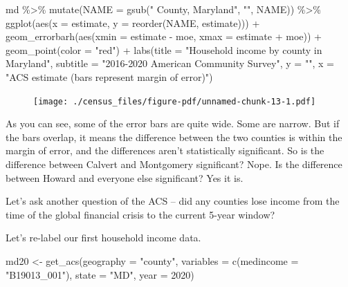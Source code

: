 \documentclass[
  letterpaper,
  DIV=11,
  numbers=noendperiod]{scrreprt}
\newenvironment{Shaded}{\begin{snugshade}}{\end{snugshade}}
\newcommand{\AttributeTok}[1]{\textcolor[rgb]{0.40,0.45,0.13}{#1}}
\newcommand{\DecValTok}[1]{\textcolor[rgb]{0.68,0.00,0.00}{#1}}
\newcommand{\FunctionTok}[1]{\textcolor[rgb]{0.28,0.35,0.67}{#1}}
\newcommand{\NormalTok}[1]{\textcolor[rgb]{0.00,0.23,0.31}{#1}}
\newcommand{\OtherTok}[1]{\textcolor[rgb]{0.00,0.23,0.31}{#1}}
\newcommand{\SpecialCharTok}[1]{\textcolor[rgb]{0.37,0.37,0.37}{#1}}
\newcommand{\StringTok}[1]{\textcolor[rgb]{0.13,0.47,0.30}{#1}}
\begin{document}
\begin{Shaded}
\begin{Highlighting}[]
\NormalTok{md }\SpecialCharTok{\%\textgreater{}\%}
  \FunctionTok{mutate}\NormalTok{(}\AttributeTok{NAME =} \FunctionTok{gsub}\NormalTok{(}\StringTok{" County, Maryland"}\NormalTok{, }\StringTok{""}\NormalTok{, NAME)) }\SpecialCharTok{\%\textgreater{}\%}
  \FunctionTok{ggplot}\NormalTok{(}\FunctionTok{aes}\NormalTok{(}\AttributeTok{x =}\NormalTok{ estimate, }\AttributeTok{y =} \FunctionTok{reorder}\NormalTok{(NAME, estimate))) }\SpecialCharTok{+}
  \FunctionTok{geom\_errorbarh}\NormalTok{(}\FunctionTok{aes}\NormalTok{(}\AttributeTok{xmin =}\NormalTok{ estimate }\SpecialCharTok{{-}}\NormalTok{ moe, }\AttributeTok{xmax =}\NormalTok{ estimate }\SpecialCharTok{+}\NormalTok{ moe)) }\SpecialCharTok{+}
  \FunctionTok{geom\_point}\NormalTok{(}\AttributeTok{color =} \StringTok{"red"}\NormalTok{) }\SpecialCharTok{+}
  \FunctionTok{labs}\NormalTok{(}\AttributeTok{title =} \StringTok{"Household income by county in Maryland"}\NormalTok{,}
       \AttributeTok{subtitle =} \StringTok{"2016{-}2020 American Community Survey"}\NormalTok{,}
       \AttributeTok{y =} \StringTok{""}\NormalTok{,}
       \AttributeTok{x =} \StringTok{"ACS estimate (bars represent margin of error)"}\NormalTok{)}
\end{Highlighting}
\end{Shaded}

\begin{figure}[H]

{\centering \texttt{[image: ./census\_files/figure-pdf/unnamed-chunk-13-1.pdf]}

}

\end{figure}

As you can see, some of the error bars are quite wide. Some are narrow.
But if the bars overlap, it means the difference between the two
counties is within the margin of error, and the differences aren't
statistically significant. So is the difference between Calvert and
Montgomery significant? Nope. Is the difference between Howard and
everyone else significant? Yes it is.

Let's ask another question of the ACS -- did any counties lose income
from the time of the global financial crisis to the current 5-year
window?

Let's re-label our first household income data.

\begin{Shaded}
\begin{Highlighting}[]
\NormalTok{md20 }\OtherTok{\textless{}{-}} \FunctionTok{get\_acs}\NormalTok{(}\AttributeTok{geography =} \StringTok{"county"}\NormalTok{,}
              \AttributeTok{variables =} \FunctionTok{c}\NormalTok{(}\AttributeTok{medincome =} \StringTok{"B19013\_001"}\NormalTok{),}
              \AttributeTok{state =} \StringTok{"MD"}\NormalTok{,}
              \AttributeTok{year =} \DecValTok{2020}\NormalTok{)}
\end{Highlighting}
\end{Shaded}
\end{document}
